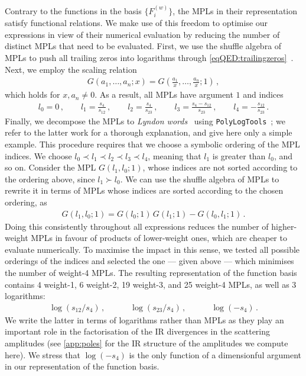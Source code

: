 \documentclass[main.tex]{subfiles}
\begin{document}
Contrary to the functions in the basis $\{F^{(w)}_i\}$, the \acp{MPL} in their representation satisfy functional relations. We make use of this freedom to optimise our expressions in view of their numerical evaluation by reducing the number of distinct \acp{MPL} that need to be evaluated. First, we use the shuffle algebra of \acp{MPL} to push all trailing zeros into logarithms through \cref{eqQED:trailingzeros}~\cite{Vollinga:2004sn}. Next, we employ the scaling relation
\begin{align}
G(a_1, \ldots, a_n; x) = G\left(\frac{a_1}{x}, \ldots, \frac{a_n}{x}; 1\right) \,,
\end{align}
which holds for $x, a_n \neq 0$. As a result, all \acp{MPL} have argument $1$ and indices
\begin{align} \label{eqQED:indices}
l_0 = 0 \,, \qquad 
l_1 = \frac{s_4}{s_{12}} \,, \qquad 
l_2 = \frac{s_4}{s_{23}} \,, \qquad
l_3 = \frac{s_4-s_{12}}{s_{23}} \,, \qquad
l_4 = - \frac{s_{12}}{s_{23}}\,.
\end{align}
%
Finally, we decompose the \acp{MPL} to \emph{Lyndon words}~\cite{Radford1979ANR} using \texttt{PolyLogTools}~\cite{Duhr:2019tlz}; we refer to the latter work for a thorough explanation, and give here only a simple example. 
This procedure requires that we choose a symbolic ordering of the \ac{MPL} indices. We choose $l_0 \prec l_1 \prec l_2 \prec l_3 \prec l_4$, meaning that $l_1$ is greater than $l_0$, and so on. 
Consider the \ac{MPL} $G(l_1, l_0; 1)$, whose indices are not sorted according to the ordering above, since $l_1 \succ l_0$. We can use the shuffle algebra of \acp{MPL} to rewrite it in terms of \acp{MPL} whose indices are sorted according to the chosen ordering, as
\begin{align}
G(l_1, l_0; 1) = G(l_0;1) \, G(l_1;1) - G(l_0, l_1; 1) \,.
\end{align}
Doing this consistently throughout all expressions reduces the number of higher-weight \acp{MPL} in favour of products of lower-weight ones, which are cheaper to evaluate numerically. To maximise the impact in this sense, we tested all possible orderings of the indices and selected the one --- given above --- which minimises the number of weight-4 \acp{MPL}.
The resulting representation of the function basis contains $4$ weight-1, 6 weight-2, 19 weight-3, and 25 weight-4 \acp{MPL}, as well as $3$ logarithms: 
\begin{align} \label{eqQED:logs}
\log(s_{12}/s_4) \,, \qquad \quad \log(s_{23}/s_4) \,, \qquad \quad \log(-s_4) \,.
\end{align}
We write the latter in terms of logarithms rather than \acp{MPL} as they play an important role in the factorisation of the \ac{IR} divergences in the scattering amplitudes (see \cref{app:poles} for the \ac{IR} structure of the amplitudes we compute here). We stress that $\log(-s_4)$ is the only function of a dimensionful argument in our representation of the function basis. 
\end{document}
